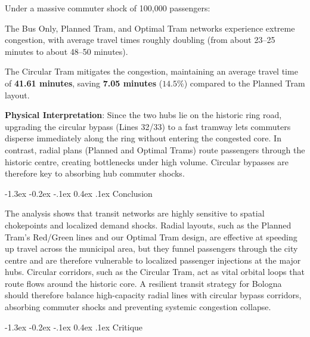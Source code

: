 \documentclass[12pt, a4paper]{article}
\makeatletter
\renewcommand\section{\@startsection {section}{1}{\z@}%
                                   {-1.3ex \@plus -0.2ex \@minus -.1ex}%
                                   {0.4ex \@plus.1ex}%
                                   {\normalfont\Large\bfseries}}
\let\olditemize\itemize
\let\endolditemize\enditemize
\renewenvironment{itemize}{\olditemize\setlength{\itemsep}{0pt}\setlength{\parskip}{0pt}\setlength{\parsep}{0pt}\setlength{\topsep}{0pt}\setlength{\partopsep}{0pt}}{\endolditemize}
\makeatother
\begin{document}
Under a massive commuter shock of 100,000 passengers:
\begin{itemize}
    \item The Bus Only, Planned Tram, and Optimal Tram networks experience extreme congestion, with average travel times roughly doubling (from about 23--25 minutes to about 48--50 minutes).
    \item The Circular Tram mitigates the congestion, maintaining an average travel time of \textbf{41.61 minutes}, saving \textbf{7.05 minutes} ($14.5\%$) compared to the Planned Tram layout.
    \item \textbf{Physical Interpretation}: Since the two hubs lie on the historic ring road, upgrading the circular bypass (Lines 32/33) to a fast tramway lets commuters disperse immediately along the ring without entering the congested core. In contrast, radial plans (Planned and Optimal Trams) route passengers through the historic centre, creating bottlenecks under high volume. Circular bypasses are therefore key to absorbing hub commuter shocks.
\end{itemize}

\section{Conclusion}
\label{conclusion}

The analysis shows that transit networks are highly sensitive to spatial chokepoints and localized demand shocks. Radial layouts, such as the Planned Tram's Red/Green lines and our Optimal Tram design, are effective at speeding up travel across the municipal area, but they funnel passengers through the city centre and are therefore vulnerable to localized passenger injections at the major hubs. Circular corridors, such as the Circular Tram, act as vital orbital loops that route flows around the historic core. A resilient transit strategy for Bologna should therefore balance high-capacity radial lines with circular bypass corridors, absorbing commuter shocks and preventing systemic congestion collapse.

\section{Critique}
\label{critique}
\end{document}
